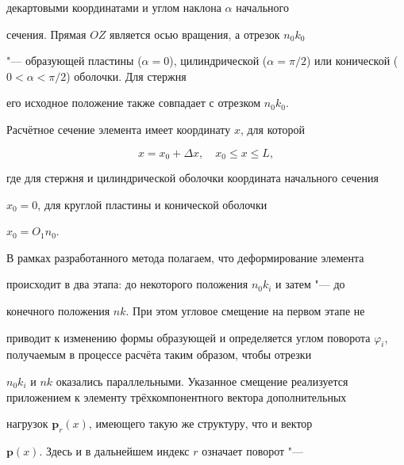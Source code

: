 декартовыми координатами и углом наклона $\alpha $ начального

сечения. Прямая $OZ$ является осью вращения, а отрезок $n_0k_0$

"--- образующей пластины ($\alpha =0$), цилиндрической ($\alpha

=\pi/2$) или конической ($0<\alpha <\pi /2$) оболочки. Для стержня

его исходное положение также совпадает с отрезком $n_0k_0$.

Расчётное сечение элемента имеет координату $x$, для которой



\vspace{-2.5mm}



\begin{equation}

\label{elen:eq1}

 x=x_0 +\Delta x, \quad x_0 \le x\le L,

\end{equation}



\vspace{-2.5mm}



\noindent

где для стержня и цилиндрической оболочки координата начального сечения

$x_0=0$, для круглой пластины и конической оболочки

$x_0=O_1n_0$.



В рамках разработанного метода полагаем, что деформирование элемента

происходит в два этапа: до некоторого положения $n_0k_i$ и затем "--- до

конечного положения $nk$. При этом угловое смещение на первом этапе не

приводит к изменению формы образующей и определяется углом поворота $\varphi

_i$, получаемым в процессе расчёта таким образом, чтобы отрезки

$n_0k_i$ и $nk$ оказались параллельными. Указанное смещение реализуется приложением к элементу трёхкомпонентного вектора дополнительных

нагрузок $\textbf{p}_r(x)$, имеющего такую же структуру, что и вектор

$\textbf{p}(x)$. Здесь и в дальнейшем индекс $r$ означает поворот "---

